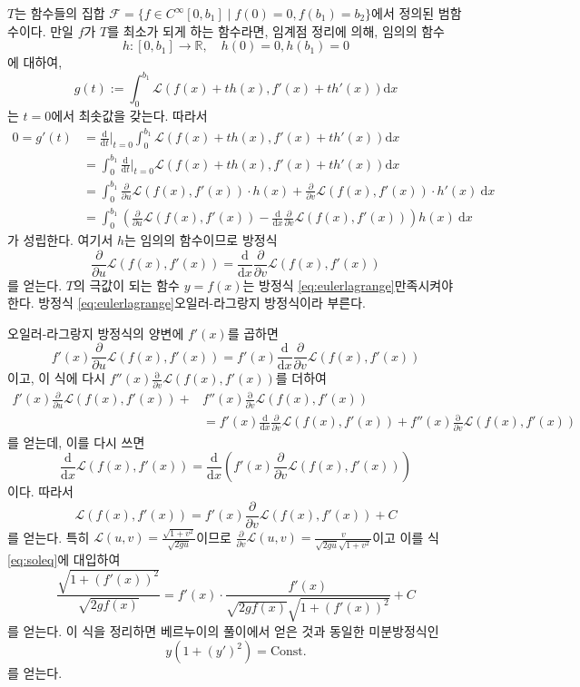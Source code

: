 $T$는  함수들의 집합 $\mathscr{F}=\{ f\in C^\infty[0, b_1]\mid f(0)=0, f(b_1)=b_2\} $에서 정의된 범함수이다. 만일 $f$가 $T$를 최소가 되게 하는 함수라면, 임계점 정리에 의해, 임의의 함수
\[
h:[0, b_1]\to \mathbb{R},\quad h(0)=0, h(b_1)=0 
\]
에 대하여, 
\[
g(t):=\int_0^{b_1}\mathscr{L}(f(x)+th(x), f'(x)+th'(x)) \mathrm{d}x
\]
는 $t=0$에서 최솟값을 갖는다. 따라서
\begin{align*}
0=g'(t)&= \frac{\mathrm{d}}{\mathrm{d}t}\Big\vert_{t=0} \int_0^{b_1}\mathscr{L}(f(x)+th(x), f'(x)+th'(x)) \mathrm{d}x \\
&= \int_0^{b_1} \frac{\mathrm{d}}{\mathrm{d}t}\Big\vert_{t=0} \mathscr{L}(f(x)+th(x), f'(x)+th'(x)) \mathrm{d}x \\
&= \int_0^{b_1} \frac{\partial}{\partial u}\mathscr{L}(f(x), f'(x) )\cdot h(x)+\frac{\partial}{\partial v}\mathscr{L}(f(x), f'(x))\cdot h'(x)\ \mathrm{d}x \\
&= \int_0^{b_1}\left( \frac{\partial}{\partial u}\mathscr{L}(f(x), f'(x))-\frac{\mathrm{d}}{\mathrm{d} x}\frac{\partial}{\partial v}\mathscr{L}(f(x), f'(x))\right)h(x)\ \mathrm{d}x
\end{align*}
가 성립한다. 여기서 $h$는 임의의 함수이므로 방정식
\begin{equation}\label{eq:eulerlagrange}
\frac{\partial}{\partial u}\mathscr{L}(f(x), f'(x))=\frac{\mathrm{d}}{\mathrm{d} x} \frac{\partial}{\partial v}\mathscr{L}(f(x), f'(x))
\end{equation}
를 얻는다.  $T$의 극값이 되는 함수 $y=f(x)$는 방정식 \eqref{eq:eulerlagrange}\를 만족시켜야 한다. 방정식 \eqref{eq:eulerlagrange}\를 오일러-라그랑지 방정식이라 부른다. \par 

오일러-라그랑지 방정식의 양변에 $f'(x)$를 곱하면
\[
f'(x) \frac{\partial}{\partial u}\mathscr{L}(f(x), f'(x))=f'(x) \frac{\mathrm{d}}{\mathrm{d} x} \frac{\partial}{\partial v}\mathscr{L}(f(x), f'(x))
\]
이고, 이 식에 다시 $f''(x)\frac{\mathrm{\partial}}{\partial v}\mathscr{L}(f(x), f'(x))$를 더하여
\begin{align*}
f'(x) \frac{\partial}{\partial u}\mathscr{L}(f(x), f'(x)) +& f''(x)\frac{\mathrm{\partial}}{\partial v}\mathscr{L}(f(x), f'(x)) \\
&=f'(x) \frac{\mathrm{d}}{\mathrm{d} x} \frac{\partial}{\partial v}\mathscr{L}(f(x), f'(x))+f''(x)\frac{\mathrm{\partial}}{\partial v}\mathscr{L}(f(x), f'(x))
\end{align*}
를 얻는데, 이를 다시 쓰면
\[
\frac{\mathrm{d}}{\mathrm{d}x}\mathscr{L}(f(x), f'(x))=\frac{\mathrm{d}}{\mathrm{d}x}\left( f'(x) \frac{\partial}{\partial v}\mathscr{L}(f(x), f'(x))\right)
\]
이다. 따라서
\begin{equation}\label{eq:soleq}
\mathscr{L}(f(x), f'(x))=f'(x)\frac{\partial}{\partial v}\mathscr{L}(f(x), f'(x))+C
\end{equation}
를 얻는다. 특히 $\mathscr{L}(u, v)=\frac{\sqrt{1+v^2}}{\sqrt{2gu}}$이므로 $\frac{\partial}{\partial v}\mathscr{L}(u, v)=\frac{v}{\sqrt{2gu}\sqrt{1+v^2}}$이고 이를 식 \eqref{eq:soleq}에 대입하여
\[
\frac{\sqrt{1+(f'(x))^2}}{\sqrt{2gf(x)}}=f'(x)\cdot \frac{f'(x)}{\sqrt{2gf(x)}\sqrt{1+(f'(x))^2}}+C
\]
를 얻는다. 이 식을 정리하면 베르누이의 풀이에서 얻은 것과 동일한 미분방정식인
\[
y(1+(y')^2)=\text{Const.}
\]
를 얻는다.


